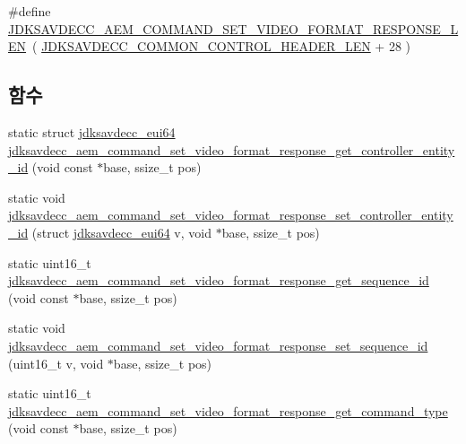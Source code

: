 \begin{DoxyCompactItemize}
\item 
\#define \hyperlink{group__command__set__video__format__response_gad774675e055c052cae2906bcadbad032}{J\+D\+K\+S\+A\+V\+D\+E\+C\+C\+\_\+\+A\+E\+M\+\_\+\+C\+O\+M\+M\+A\+N\+D\+\_\+\+S\+E\+T\+\_\+\+V\+I\+D\+E\+O\+\_\+\+F\+O\+R\+M\+A\+T\+\_\+\+R\+E\+S\+P\+O\+N\+S\+E\+\_\+\+L\+EN}~( \hyperlink{group__jdksavdecc__avtp__common__control__header_gaae84052886fb1bb42f3bc5f85b741dff}{J\+D\+K\+S\+A\+V\+D\+E\+C\+C\+\_\+\+C\+O\+M\+M\+O\+N\+\_\+\+C\+O\+N\+T\+R\+O\+L\+\_\+\+H\+E\+A\+D\+E\+R\+\_\+\+L\+EN} + 28 )
\end{DoxyCompactItemize}
\subsection*{함수}
\begin{DoxyCompactItemize}
\item 
static struct \hyperlink{structjdksavdecc__eui64}{jdksavdecc\+\_\+eui64} \hyperlink{group__command__set__video__format__response_gad82eb8678e3b4f1b0a11985396d7473f}{jdksavdecc\+\_\+aem\+\_\+command\+\_\+set\+\_\+video\+\_\+format\+\_\+response\+\_\+get\+\_\+controller\+\_\+entity\+\_\+id} (void const $\ast$base, ssize\+\_\+t pos)
\item 
static void \hyperlink{group__command__set__video__format__response_gaa71beaa40266b26ab4cf91ae2aa53de4}{jdksavdecc\+\_\+aem\+\_\+command\+\_\+set\+\_\+video\+\_\+format\+\_\+response\+\_\+set\+\_\+controller\+\_\+entity\+\_\+id} (struct \hyperlink{structjdksavdecc__eui64}{jdksavdecc\+\_\+eui64} v, void $\ast$base, ssize\+\_\+t pos)
\item 
static uint16\+\_\+t \hyperlink{group__command__set__video__format__response_gaba05f3bce66a6e9a1a46db7bff9f47c2}{jdksavdecc\+\_\+aem\+\_\+command\+\_\+set\+\_\+video\+\_\+format\+\_\+response\+\_\+get\+\_\+sequence\+\_\+id} (void const $\ast$base, ssize\+\_\+t pos)
\item 
static void \hyperlink{group__command__set__video__format__response_gaacf7a29958d77550a0d19050b8534157}{jdksavdecc\+\_\+aem\+\_\+command\+\_\+set\+\_\+video\+\_\+format\+\_\+response\+\_\+set\+\_\+sequence\+\_\+id} (uint16\+\_\+t v, void $\ast$base, ssize\+\_\+t pos)
\item 
static uint16\+\_\+t \hyperlink{group__command__set__video__format__response_gad8928bf326b5ac30e766bc9d7e3fa05c}{jdksavdecc\+\_\+aem\+\_\+command\+\_\+set\+\_\+video\+\_\+format\+\_\+response\+\_\+get\+\_\+command\+\_\+type} (void const $\ast$base, ssize\+\_\+t pos)
\item 

\end{DoxyCompactItemize}
